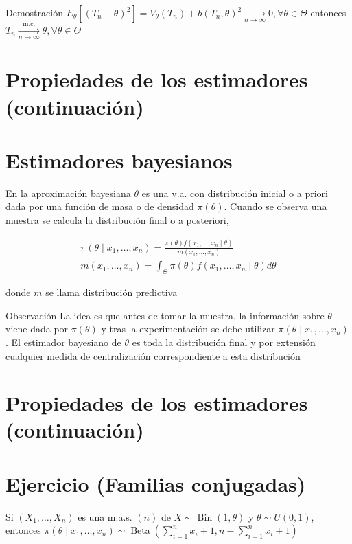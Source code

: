 Demostración $E_{\theta}\left[\left(T_{n}-\theta\right)^{2}\right]=V_{\theta}\left(T_{n}\right)+b\left(T_{n}, \theta\right)^{2} \underset{n \rightarrow \infty}{\longrightarrow} 0, \forall \theta \in \Theta$ entonces $T_{n} \xrightarrow[n \rightarrow \infty]{\text { m.c. }} \theta, \forall \theta \in \Theta$

\section*{Propiedades de los estimadores (continuación)}
\section*{Estimadores bayesianos}
En la aproximación bayesiana $\theta$ es una v.a. con distribución inicial o a priori dada por una función de masa o de densidad $\pi(\theta)$. Cuando se observa una muestra se calcula la distribución final o a posteriori,

$$
  \begin{gathered}
    \pi\left(\theta \mid x_{1}, \ldots, x_{n}\right)=\frac{\pi(\theta) f\left(x_{1}, \ldots, x_{n} \mid \theta\right)}{m\left(x_{1}, \ldots, x_{n}\right)} \\
    m\left(x_{1}, \ldots, x_{n}\right)=\int_{\Theta} \pi(\theta) f\left(x_{1}, \ldots, x_{n} \mid \theta\right) d \theta
  \end{gathered}
$$

donde $m$ se llama distribución predictiva

Observación La idea es que antes de tomar la muestra, la información sobre $\theta$ viene dada por $\pi(\theta)$ y tras la experimentación se debe utilizar $\pi\left(\theta \mid x_{1}, \ldots, x_{n}\right)$. El estimador bayesiano de $\theta$ es toda la distribución final y por extensión cualquier medida de centralización correspondiente a esta distribución

\section*{Propiedades de los estimadores (continuación)}
\section*{Ejercicio (Familias conjugadas)}
Si $\left(X_{1}, \ldots, X_{n}\right)$ es una m.a.s. $(n)$ de $X \sim \operatorname{Bin}(1, \theta)$ y $\theta \sim U(0,1)$, entonces $\pi\left(\theta \mid x_{1}, \ldots, x_{n}\right) \sim \operatorname{Beta}\left(\sum_{i=1}^{n} x_{i}+1, n-\sum_{i=1}^{n} x_{i}+1\right)$


